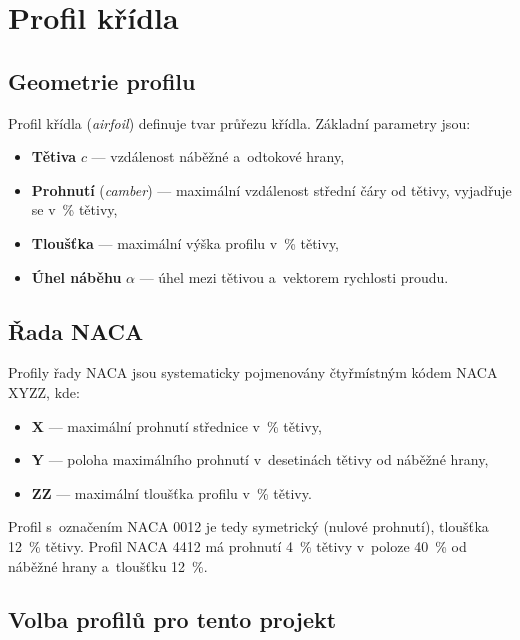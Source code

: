 \documentclass[12pt, a4paper, oneside]{report}
\begin{document}

\section{Profil křídla}
\label{sec:profil}

\subsection{Geometrie profilu}

Profil křídla (\textit{airfoil}) definuje tvar průřezu křídla. Základní parametry
jsou:

\begin{itemize}
    \item \textbf{Tětiva} $c$ --- vzdálenost náběžné a~odtokové hrany,
    \item \textbf{Prohnutí} (\textit{camber}) --- maximální vzdálenost střední čáry
          od tětivy, vyjadřuje se v~\% tětivy,
    \item \textbf{Tloušťka} --- maximální výška profilu v~\% tětivy,
    \item \textbf{Úhel náběhu} $\alpha$ --- úhel mezi tětivou a~vektorem rychlosti
          proudu.
\end{itemize}

\subsection{Řada NACA}

Profily řady NACA jsou systematicky pojmenovány čtyřmístným kódem NACA XYZZ,
kde:

\begin{itemize}
    \item \textbf{X} --- maximální prohnutí střednice v~\% tětivy,
    \item \textbf{Y} --- poloha maximálního prohnutí v~desetinách tětivy od náběžné hrany,
    \item \textbf{ZZ} --- maximální tloušťka profilu v~\% tětivy.
\end{itemize}

Profil s~označením NACA 0012 je tedy symetrický (nulové prohnutí),
tloušťka 12~\% tětivy. Profil NACA 4412 má prohnutí 4~\% tětivy
v~poloze 40~\% od náběžné hrany a~tloušťku 12~\%.

\subsection{Volba profilů pro tento projekt}
\end{document}
